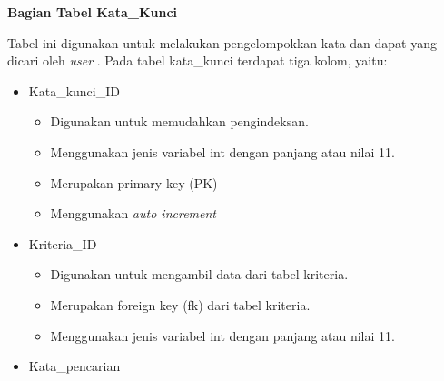\documentclass[a4paper,twoside]{article}
\begin{document}
\begin{enumerate}
\begin{itemize}
\begin{itemize}
	\end{itemize}
\end{itemize}

\textbf{Bagian Tabel Kata\_Kunci}

Tabel ini digunakan untuk melakukan pengelompokkan kata dan dapat yang dicari oleh \textit{user} . Pada tabel kata\_kunci terdapat tiga kolom, yaitu:

	\begin{itemize}
		\item Kata\_kunci\_ID 
		
		\begin{itemize}
		\item Digunakan untuk memudahkan pengindeksan.
		\item Menggunakan jenis variabel int dengan panjang atau nilai 11.
		\item Merupakan primary key (PK)
		
			
		\item Menggunakan \textit{auto increment}
		
		
	\end{itemize}
		
		\item Kriteria\_ID 
		
		\begin{itemize}
			\item Digunakan untuk mengambil data dari tabel kriteria.
			\item Merupakan foreign key (fk) dari tabel kriteria.
			\item Menggunakan jenis variabel int dengan panjang atau nilai 11.
		\end{itemize}
		
		\item Kata\_pencarian 
	

\end{itemize}
\end{enumerate}
\end{document}
